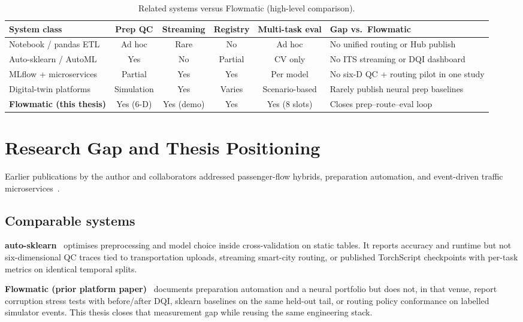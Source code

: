 \begin{table}[H]
  \centering
  \caption{Related systems versus Flowmatic (high-level comparison).}
  \label{tab:related-systems}
  \footnotesize
  \begin{tabular}{@{}p{2.6cm}ccccp{2.4cm}@{}}
    \toprule
    \textbf{System class} & \textbf{Prep QC} & \textbf{Streaming} & \textbf{Registry} & \textbf{Multi-task eval} & \textbf{Gap vs.\ Flowmatic} \\
    \midrule
    Notebook / pandas ETL & Ad hoc & Rare & No & Ad hoc & No unified routing or Hub publish \\
    Auto-sklearn / AutoML & Yes & No & Partial & CV only & No ITS streaming or DQI dashboard \\
    MLflow + microservices & Partial & Yes & Yes & Per model & No six-D QC + routing pilot in one study \\
    Digital-twin platforms & Simulation & Yes & Varies & Scenario-based & Rarely publish neural prep baselines \\
    \textbf{Flowmatic (this thesis)} & Yes (6-D) & Yes (demo) & Yes & Yes (8 slots) & Closes prep--route--eval loop \\
    \bottomrule
  \end{tabular}
\end{table}

\section{Research Gap and Thesis Positioning}

Earlier publications by the author and collaborators addressed passenger-flow hybrids, preparation automation, and event-driven traffic microservices~\cite{bakytuly2024hybrid,yedilkhan2025flowmatic,bakytuly2025adaptive,bakytuly2026microservices}.

\subsection{Comparable systems}

\textbf{auto-sklearn}~\cite{feurer2015autosklearn,feurer2019auto} optimises preprocessing and model choice inside cross-validation on static tables. It reports accuracy and runtime but not six-dimensional QC traces tied to transportation uploads, streaming smart-city routing, or published TorchScript checkpoints with per-task metrics on identical temporal splits.

\textbf{Flowmatic (prior platform paper)}~\cite{yedilkhan2025flowmatic} documents preparation automation and a neural portfolio but does not, in that venue, report corruption stress tests with before/after DQI, sklearn baselines on the same held-out tail, or routing policy conformance on labelled simulator events. This thesis closes that measurement gap while reusing the same engineering stack.

